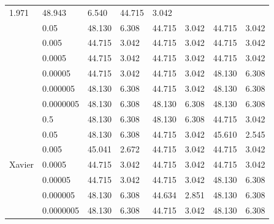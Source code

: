 \begin{table}[H]
\begin{tabular}{cl|llllll|}
    \multicolumn{1}{l|}{1.971} &
    48.943 &
    \multicolumn{1}{l|}{6.540} &
    44.715 &
    3.042 \\
\multicolumn{1}{|c|}{} &
    0.05 &
    48.130 &
    \multicolumn{1}{l|}{6.308} &
    44.715 &
    \multicolumn{1}{l|}{3.042} &
    44.715 &
    3.042 \\
\multicolumn{1}{|c|}{} &
    0.005 &
    44.715 &
    \multicolumn{1}{l|}{3.042} &
    44.715 &
    \multicolumn{1}{l|}{3.042} &
    44.715 &
    3.042 \\
\multicolumn{1}{|c|}{} &
    0.0005 &
    44.715 &
    \multicolumn{1}{l|}{3.042} &
    44.715 &
    \multicolumn{1}{l|}{3.042} &
    44.715 &
    3.042 \\
\multicolumn{1}{|c|}{} &
    0.00005 &
    44.715 &
    \multicolumn{1}{l|}{3.042} &
    44.715 &
    \multicolumn{1}{r|}{3.042} &
    48.130 &
    6.308 \\
\multicolumn{1}{|c|}{} &
    0.000005 &
    48.130 &
    \multicolumn{1}{l|}{6.308} &
    44.715 &
    \multicolumn{1}{r|}{3.042} &
    48.130 &
    6.308 \\
\multicolumn{1}{|c|}{} &
    0.0000005 &
    48.130 &
    \multicolumn{1}{l|}{6.308} &
    48.130 &
    \multicolumn{1}{r|}{6.308} &
    48.130 &
    6.308 \\ \hline
\multicolumn{1}{|c|}{\multirow{7}{*}{Xavier}} &
    0.5 &
    48.130 &
    \multicolumn{1}{l|}{6.308} &
    48.130 &
    \multicolumn{1}{l|}{6.308} &
    44.715 &
    \multicolumn{1}{r|}{3.042} \\
\multicolumn{1}{|c|}{} &
    0.05 &
    48.130 &
    \multicolumn{1}{l|}{6.308} &
    44.715 &
    \multicolumn{1}{l|}{3.042} &
    45.610 &
    2.545 \\
\multicolumn{1}{|c|}{} &
    0.005 &
    45.041 &
    \multicolumn{1}{l|}{2.672} &
    44.715 &
    \multicolumn{1}{l|}{3.042} &
    44.715 &
    3.042 \\
\multicolumn{1}{|c|}{} &
    0.0005 &
    44.715 &
    \multicolumn{1}{l|}{3.042} &
    44.715 &
    \multicolumn{1}{r|}{3.042} &
    44.715 &
    3.042 \\
\multicolumn{1}{|c|}{} &
    0.00005 &
    44.715 &
    \multicolumn{1}{l|}{3.042} &
    44.715 &
    \multicolumn{1}{r|}{3.042} &
    48.130 &
    6.308 \\
\multicolumn{1}{|c|}{} &
    0.000005 &
    48.130 &
    \multicolumn{1}{l|}{6.308} &
    44.634 &
    \multicolumn{1}{l|}{2.851} &
    48.130 &
    6.308 \\
\multicolumn{1}{|c|}{} &
    0.0000005 &
    48.130 &
    \multicolumn{1}{l|}{6.308} &
    44.715 &
    \multicolumn{1}{l|}{3.042} &
    48.130 &
    6.308 \\ \hline
\end{tabular}
\end{table}


